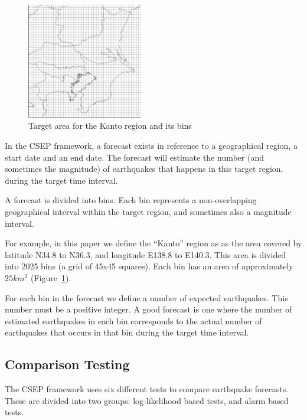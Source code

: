 \documentclass[a4paper,twoside]{article}
\begin{document}
\begin{figure}
  \begin{center}
    \includegraphics[width=0.45\textwidth]{img/kantomap.png}
  \end{center}
  \caption{Target area for the Kanto region and its bins}
  \label{fig:kantomap}
\end{figure}

In the CSEP framework, a forecast exists in reference to a
geographical region, a start date and an end date. The forecast will
estimate the number (and sometimes the magnitude) of earthquakes
that happens in this target region, during the target time interval.

A forecast is divided into bins. Each bin represents a non-overlapping
geographical interval within the target region, and sometimes also a
magnitude interval.

For example, in this paper we define the ``Kanto'' region as as the
area covered by latitude N34.8 to N36.3, and longitude E138.8 to
E140.3. This area is divided into 2025 bins (a grid of 45x45
squares). Each bin has an area of approximately $25km^2$
(Figure~\ref{fig:kantomap}).

For each bin in the forecast we define a number of expected
earthquakes. This number must be a positive integer. A good forecast
is one where the number of estimated earthquakes in each bin
corresponds to the actual number of earthquakes that occurs in that
bin during the target time interval.

\subsection{Comparison Testing}\label{CSEPTests}

The CSEP framework uses six different tests to compare earthquake
forecasts. These are divided into two groups: log-likelihood based
tests, and alarm based tests.
\end{document}
